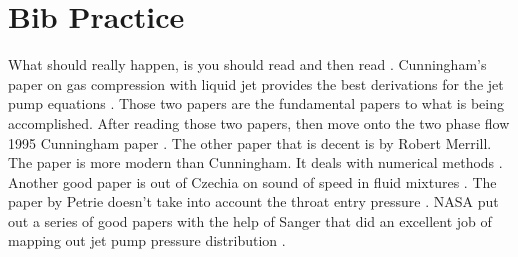 \documentclass{article}
\begin{document}
\section{Bib Practice}

What should really happen, is you should read \cite{cunn_gas} and then read \cite{cunn_break}. Cunningham's paper on gas compression with liquid jet provides the best derivations for the jet pump equations \cite{cunn_gas}. Those two papers are the fundamental papers to what is being accomplished. After reading those two papers, then move onto the two phase flow 1995 Cunningham paper \cite{cunn_two}. The other paper that is decent is by Robert Merrill. The paper is more modern than Cunningham. It deals with numerical methods \cite{merrill}. Another good paper is out of Czechia on sound of speed in fluid mixtures \cite{himr}. The paper by Petrie doesn't take into account the throat entry pressure \cite{petrie}. NASA put out a series of good papers with the help of Sanger that did an excellent job of mapping out jet pump pressure distribution \cite{sanger}.

\printbibliography
\end{document}

